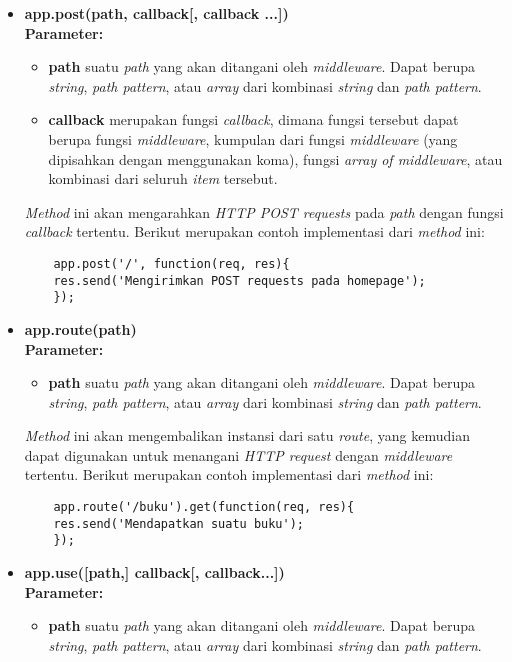 \begin{itemize}
	\item \textbf{app.post(path, callback[, callback ...])} \\ \textbf{Parameter:}
	\begin{itemize}
		\item \textbf{path} suatu \textit{path} yang akan ditangani oleh \textit{middleware}. Dapat berupa \textit{string}, \textit{path pattern}, atau \textit{array} dari kombinasi \textit{string} dan \textit{path pattern}.
		
		\item \textbf{callback} merupakan fungsi \textit{callback}, dimana fungsi tersebut dapat berupa fungsi \textit{middleware}, kumpulan dari fungsi \textit{middleware} (yang dipisahkan dengan menggunakan koma), fungsi \textit{array of middleware}, atau kombinasi dari seluruh \textit{item} tersebut.
	\end{itemize}
	
	\textit{Method} ini akan mengarahkan \textit{HTTP POST requests} pada \textit{path} dengan fungsi \textit{callback} tertentu. Berikut merupakan contoh implementasi dari \textit{method} ini:
	\begin{lstlisting}
	app.post('/', function(req, res){
	res.send('Mengirimkan POST requests pada homepage');
	});
	\end{lstlisting}
	
	\item \textbf{app.route(path)} \\ \textbf{Parameter:}
	\begin{itemize}
		\item \textbf{path} suatu \textit{path} yang akan ditangani oleh \textit{middleware}. Dapat berupa \textit{string}, \textit{path pattern}, atau \textit{array} dari kombinasi \textit{string} dan \textit{path pattern}.
	\end{itemize}
	
	\textit{Method} ini akan mengembalikan instansi dari satu \textit{route}, yang kemudian dapat digunakan untuk menangani \textit{HTTP request} dengan \textit{middleware} tertentu. Berikut merupakan contoh implementasi dari \textit{method} ini:
	\begin{lstlisting}
	app.route('/buku').get(function(req, res){
	res.send('Mendapatkan suatu buku');
	});
	\end{lstlisting}
	
	\item \textbf{app.use([path,] callback[, callback...])} \\ \textbf{Parameter:} 
	\begin{itemize}
		\item \textbf{path} suatu \textit{path} yang akan ditangani oleh \textit{middleware}. Dapat berupa \textit{string}, \textit{path pattern}, atau \textit{array} dari kombinasi \textit{string} dan \textit{path pattern}.
		

\end{itemize}
\end{itemize}
